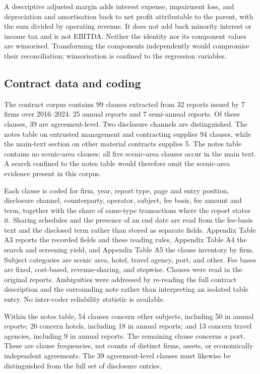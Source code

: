 \documentclass[review,3p,times]{elsarticle}
\begin{document}
A descriptive adjusted margin adds interest expense, impairment loss, and depreciation and amortisation back to net profit attributable to the parent, with the sum divided by operating revenue. It does not add back minority interest or income tax and is not EBITDA. Neither the identity nor its component values are winsorised. Transforming the components independently would compromise their reconciliation; winsorisation is confined to the regression variables.

\subsection{Contract data and coding}

The contract corpus contains 99 clauses extracted from 32 reports issued by 7 firms over 2016--2024: 25 annual reports and 7 semi-annual reports. Of these clauses, 39 are agreement-level. Two disclosure channels are distinguished. The notes table on entrusted management and contracting supplies 94 clauses, while the main-text section on other material contracts supplies 5. The notes table contains no scenic-area clauses; all five scenic-area clauses occur in the main text. A search confined to the notes table would therefore omit the scenic-area evidence present in this corpus.

Each clause is coded for firm, year, report type, page and entry position, disclosure channel, counterparty, operator, subject, fee basis, fee amount and term, together with the share of same-type transactions where the report states it. Sharing schedules and the presence of an end date are read from the fee-basis text and the disclosed term rather than stored as separate fields. Appendix Table A3 reports the recorded fields and these reading rules, Appendix Table A4 the search and screening yield, and Appendix Table A5 the clause inventory by firm. Subject categories are scenic area, hotel, travel agency, port, and other. Fee bases are fixed, cost-based, revenue-sharing, and stepwise. Clauses were read in the original reports. Ambiguities were addressed by re-reading the full contract description and the surrounding note rather than interpreting an isolated table entry. No inter-coder reliability statistic is available.

Within the notes table, 54 clauses concern other subjects, including 50 in annual reports; 26 concern hotels, including 18 in annual reports; and 13 concern travel agencies, including 9 in annual reports. The remaining clause concerns a port. These are clause frequencies, not counts of distinct firms, assets, or economically independent agreements. The 39 agreement-level clauses must likewise be distinguished from the full set of disclosure entries.
\end{document}
